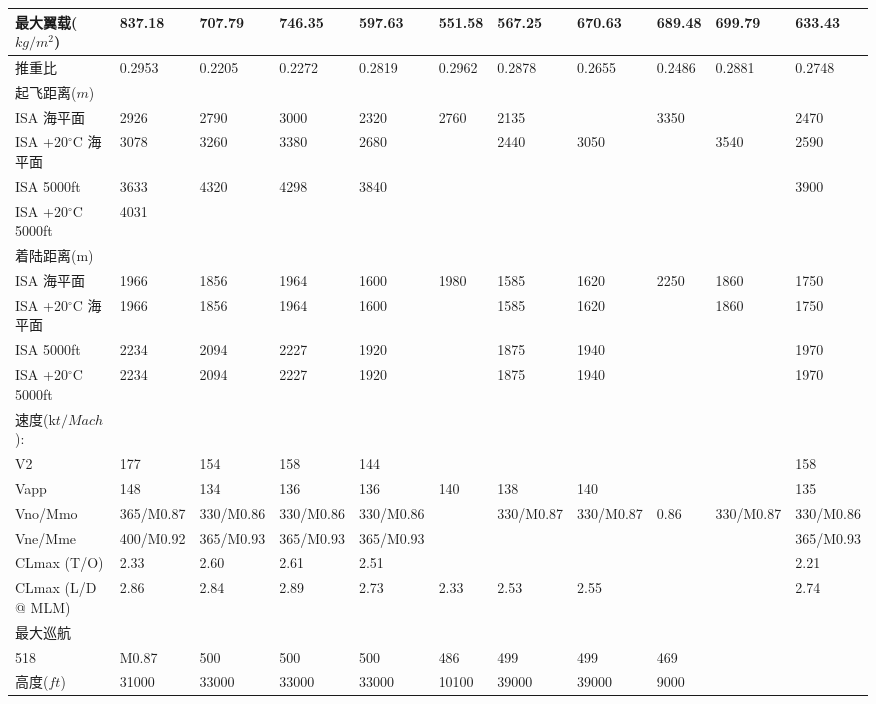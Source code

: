 \documentclass[12pt,a4paper]{report}
\begin{document}
\begin{landscape}
\begin{center}
\begin{longtable}{|p{1.5cm}|p{1.3cm}|p{1.1cm}|p{1.1cm}|p{1.1cm}|p{1.1cm}|p{1.1cm}|p{1.1cm}|p{1.1cm}|p{1.1cm}|p{1.1cm}|}
最大翼载($kg/m^2$)	&	837.18	&	707.79	&	746.35	&	597.63	&	551.58	&	567.25	&	670.63	&	689.48	&	699.79	&	633.43\\ \hline
推重比	&	0.2953	&	0.2205	&	0.2272	&	0.2819	&	0.2962	&	0.2878	&	0.2655	&	0.2486	&	0.2881	&	0.2748\\ \hline
起飞距离($m$)	&		&		&		&		&		&		&		&		&		&	\\ \hline
ISA 海平面	&	2926	&	2790	&	3000	&	2320	&	2760	&	2135	&		&	3350	&		&	2470\\ \hline
ISA +20$^\circ$C 海平面	&	3078	&	3260	&	3380	&	2680	&		&	2440	&	3050	&		&	3540	&	2590\\ \hline
ISA 5000ft	&	3633	&	4320	&	4298	&	3840	&		&		&		&		&		&	3900\\ \hline
ISA +20$^\circ$C 5000ft	&	4031	&		&		&		&		&		&		&		&		&	\\ \hline
着陆距离(m)	&		&		&		&		&		&		&		&		&		&	\\ \hline
ISA 海平面	&	1966	&	1856	&	1964	&	1600	&	1980	&	1585	&	1620	&	2250	&	1860	&	1750\\ \hline
ISA +20$^\circ$C 海平面	&	1966	&	1856	&	1964	&	1600	&		&	1585	&	1620	&		&	1860	&	1750\\ \hline
ISA 5000ft	&	2234	&	2094	&	2227	&	1920	&		&	1875	&	1940	&		&		&	1970\\ \hline
ISA +20$^\circ$C 5000ft	&	2234	&	2094	&	2227	&	1920	&		&	1875	&	1940	&		&		&	1970\\ \hline
速度(k$t/Mach$):	&		&		&		&		&		&		&		&		&		&	\\ \hline
V2	&	177	&	154	&	158	&	144	&		&		&		&		&		&	158\\ \hline
Vapp	&	148	&	134	&	136	&	136	&	140	&	138	&	140	&		&		&	135\\ \hline
Vno/Mmo	&	365/M0.87	&	330/M0.86	&	330/M0.86	&	330/M0.86	&		&	330/M0.87	&	330/M0.87	&	0.86	&	330/M0.87	&	330/M0.86\\ \hline
Vne/Mme	&	400/M0.92	&	365/M0.93	&	365/M0.93	&	365/M0.93	&		&		&		&		&		&	365/M0.93\\ \hline
CLmax (T/O)	&	2.33	&	2.60	&	2.61	&	2.51	&		&		&		&		&		&	2.21\\ \hline
CLmax (L/D @ MLM)	&	2.86	&	2.84	&	2.89	&	2.73	&	2.33	&	2.53	&	2.55	&		&		&	2.74\\ \hline
最大巡航	&		&		&		&		&		&		&		&		&		&	\\ \hline
518	&	M0.87	&	500	&	500	&	500	&	486	&	499	&	499	&	469	&		&	\\ \hline
高度($ft$)	&	31000	&	33000	&	33000	&	33000	&	10100	&	39000	&	39000	&	9000	&		&	\\ \hline

\end{longtable}
\end{center}
\end{landscape}
\end{document}
